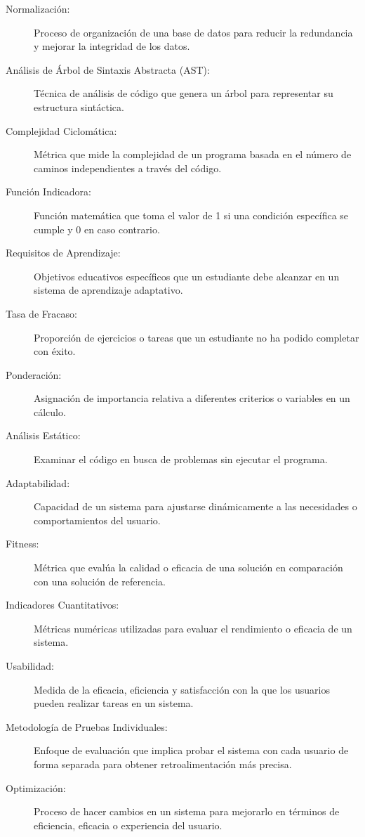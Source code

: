 \begin{description}
    \item[Normalización:] Proceso de organización de una base de datos para reducir la redundancia y mejorar la integridad de los datos.
    \item[Análisis de Árbol de Sintaxis Abstracta (AST):] Técnica de análisis de código que genera un árbol para representar su estructura sintáctica.
    \item[Complejidad Ciclomática:] Métrica que mide la complejidad de un programa basada en el número de caminos independientes a través del código.
    \item[Función Indicadora:] Función matemática que toma el valor de 1 si una condición específica se cumple y 0 en caso contrario.
    \item[Requisitos de Aprendizaje:] Objetivos educativos específicos que un estudiante debe alcanzar en un sistema de aprendizaje adaptativo.
    \item[Tasa de Fracaso:] Proporción de ejercicios o tareas que un estudiante no ha podido completar con éxito.
    \item[Ponderación:] Asignación de importancia relativa a diferentes criterios o variables en un cálculo.
    \item[Análisis Estático:] Examinar el código en busca de problemas sin ejecutar el programa.
    \item[Adaptabilidad:] Capacidad de un sistema para ajustarse dinámicamente a las necesidades o comportamientos del usuario.
    \item[Fitness:] Métrica que evalúa la calidad o eficacia de una solución en comparación con una solución de referencia.
    \item[Indicadores Cuantitativos:] Métricas numéricas utilizadas para evaluar el rendimiento o eficacia de un sistema.
    \item[Usabilidad:] Medida de la eficacia, eficiencia y satisfacción con la que los usuarios pueden realizar tareas en un sistema.
    \item[Metodología de Pruebas Individuales:] Enfoque de evaluación que implica probar el sistema con cada usuario de forma separada para obtener retroalimentación más precisa.
    \item[Optimización:] Proceso de hacer cambios en un sistema para mejorarlo en términos de eficiencia, eficacia o experiencia del usuario.
\end{description}
